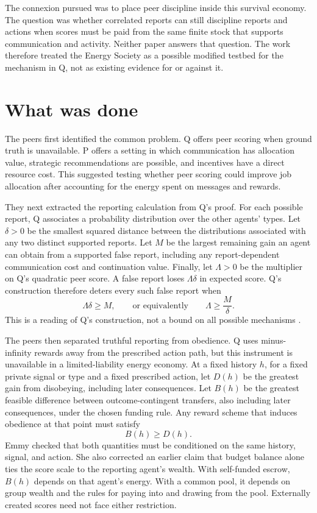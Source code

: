 \documentclass{article}
\begin{document}
The connexion pursued was to place peer discipline inside this survival economy.  The question was whether correlated reports can still discipline reports and actions when scores must be paid from the same finite stock that supports communication and activity.  Neither paper answers that question.  The work therefore treated the Energy Society as a possible modified testbed for the mechanism in Q, not as existing evidence for or against it.

\section{What was done}

The peers first identified the common problem.  Q offers peer scoring when ground truth is unavailable.  P offers a setting in which communication has allocation value, strategic recommendations are possible, and incentives have a direct resource cost.  This suggested testing whether peer scoring could improve job allocation after accounting for the energy spent on messages and rewards.

They next extracted the reporting calculation from Q's proof.  For each possible report, Q associates a probability distribution over the other agents' types.  Let $\delta>0$ be the smallest squared distance between the distributions associated with any two distinct supported reports.  Let $M$ be the largest remaining gain an agent can obtain from a supported false report, including any report-dependent communication cost and continuation value.  Finally, let $\Lambda>0$ be the multiplier on Q's quadratic peer score.  A false report loses $\Lambda\delta$ in expected score.  Q's construction therefore deters every such false report when
\begin{equation}
  \Lambda\delta \geq M,
  \qquad\text{or equivalently}\qquad
  \Lambda \geq \frac{M}{\delta}.
  \label{eq:reporting}
\end{equation}
This is a reading of Q's construction, not a bound on all possible mechanisms \cite{Q}.

The peers then separated truthful reporting from obedience.  Q uses minus-infinity rewards away from the prescribed action path, but this instrument is unavailable in a limited-liability energy economy.  At a fixed history $h$, for a fixed private signal or type and a fixed prescribed action, let $D(h)$ be the greatest gain from disobeying, including later consequences.  Let $B(h)$ be the greatest feasible difference between outcome-contingent transfers, also including later consequences, under the chosen funding rule.  Any reward scheme that induces obedience at that point must satisfy
\begin{equation}
  B(h) \geq D(h).
  \label{eq:obedience}
\end{equation}
Emmy checked that both quantities must be conditioned on the same history, signal, and action.  She also corrected an earlier claim that budget balance alone ties the score scale to the reporting agent's wealth.  With self-funded escrow, $B(h)$ depends on that agent's energy.  With a common pool, it depends on group wealth and the rules for paying into and drawing from the pool.  Externally created scores need not face either restriction.
\end{document}
